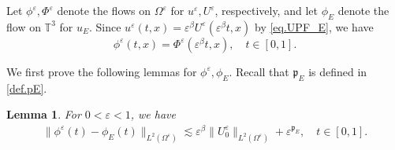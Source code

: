\documentclass[11pt,a4paper]{article}
\numberwithin{equation}{section}
\newtheorem{lemma}[theorem]{Lemma}
\newcommand{\T}{\mathbb{T}}
\newcommand{\eps}{\varepsilon}
\begin{document}
Let $\phi^\eps, \Phi^\eps$ denote the flows on $\Omega^\eps$ for $u^\eps, U^\eps$, respectively, and let $\phi_E$ denote the flow on $\T^3$ for $u_E$. Since $u^\eps(t,x)=\eps^\beta U^\eps(\eps^\beta t,x)$ by \eqref{eq.UPF_E}, we have 
\begin{equation}\label{eq.FlowMaps_E}
    \phi^\eps(t,x) = \Phi^\eps(\eps^\beta t,x),
    \quad
    t\in [0,1]. 
\end{equation}


We first prove the following lemmas for $\phi^\eps, \phi_E$. Recall that $\mathfrak p_E$ is defined in \eqref{def.pE}.


\begin{lemma}\label{lem.RoC.phiE}
For  $0<\eps<1$, we have
\begin{equation}\label{est1.lem.RoC.phiE}
\begin{split}
    \|\phi^\eps(t) - \phi_E(t)\|_{L^2(\Omega^\eps)}
    \lesssim
    \eps^\beta \|U^\eps_0\|_{L^2(\Omega^\eps)} + \eps^{\mathfrak p_E},
    \quad
    t\in [0,1]. 
\end{split}
\end{equation}
\end{lemma}
\end{document}
